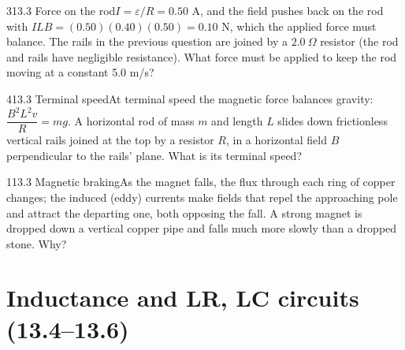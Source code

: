 \documentclass[11pt]{article}
\begin{document}
\begin{q}{3}{13.3 Force on the rod}{$I = \varepsilon/R = 0.50$ A, and the field pushes back on the rod with $ILB = (0.50)(0.40)(0.50) = 0.10$ N, which the applied force must balance.}
The rails in the previous question are joined by a $2.0\ \Omega$ resistor (the rod and rails have negligible resistance). What force must be applied to keep the rod moving at a constant 5.0 m/s?
\end{q}
\begin{q}{4}{13.3 Terminal speed}{At terminal speed the magnetic force balances gravity: $\dfrac{B^2L^2v}{R} = mg$.}
A horizontal rod of mass $m$ and length $L$ slides down frictionless vertical rails joined at the top by a resistor $R$, in a horizontal field $B$ perpendicular to the rails' plane. What is its terminal speed?
\end{q}
\begin{q}{1}{13.3 Magnetic braking}{As the magnet falls, the flux through each ring of copper changes; the induced (eddy) currents make fields that repel the approaching pole and attract the departing one, both opposing the fall.}
A strong magnet is dropped down a vertical copper pipe and falls much more slowly than a dropped stone. Why?
\end{q}

\section{Inductance and LR, LC circuits (13.4--13.6)}
\end{document}
